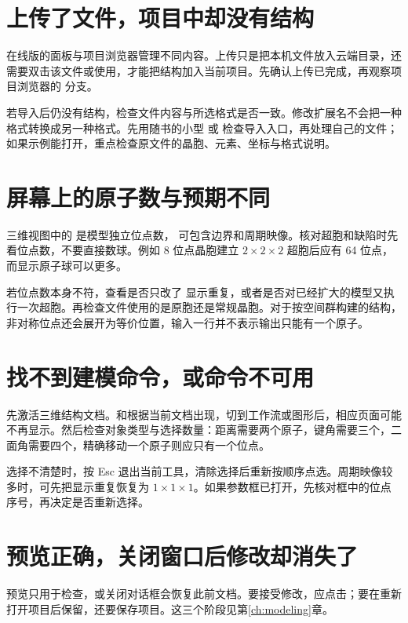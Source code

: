 \section{上传了文件，项目中却没有结构}

在线版的面板与项目浏览器管理不同内容。上传只是把本机文件放入云端目录，还需要双击该文件或使用，才能把结构加入当前项目。先确认上传已完成，再观察项目浏览器的  分支。

若导入后仍没有结构，检查文件内容与所选格式是否一致。修改扩展名不会把一种格式转换成另一种格式。先用随书的小型 \mbox{} 或 \mbox{} 检查导入入口，再处理自己的文件；如果示例能打开，重点检查原文件的晶胞、元素、坐标与格式说明。

\section{屏幕上的原子数与预期不同}

三维视图中的  是模型独立位点数， 可包含边界和周期映像。核对超胞和缺陷时先看位点数，不要直接数球。例如 8 位点晶胞建立 $2\times2\times2$ 超胞后应有 64 位点，而显示原子球可以更多。

若位点数本身不符，查看是否只改了  显示重复，或者是否对已经扩大的模型又执行一次超胞。再检查文件使用的是原胞还是常规晶胞。对于按空间群构建的结构，非对称位点还会展开为等价位置，输入一行并不表示输出只能有一个原子。

\section{找不到建模命令，或命令不可用}

先激活三维结构文档。和根据当前文档出现，切到工作流或图形后，相应页面可能不再显示。然后检查对象类型与选择数量：距离需要两个原子，键角需要三个，二面角需要四个，精确移动一个原子则应只有一个位点。

选择不清楚时，按 Esc 退出当前工具，清除选择后重新按顺序点选。周期映像较多时，可先把显示重复恢复为 $1\times1\times1$。如果参数框已打开，先核对框中的位点序号，再决定是否重新选择。

\section{预览正确，关闭窗口后修改却消失了}

预览只用于检查，或关闭对话框会恢复此前文档。要接受修改，应点击；要在重新打开项目后保留，还要保存项目。这三个阶段见第\ref{ch:modeling}章。

